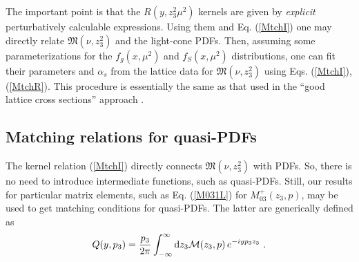 The important point is that the $R(y, z_3^2 \mu^2)$ kernels are given by {\it explicit} perturbatively calculable
expressions. Using them and Eq. (\ref{MtchI}) one may directly relate
${\mathfrak M}(\nu,z_3^2)$ and the light-cone
PDFs.
Then,
assuming some parameterizations for the $f_g(x,\mu^2)$ and $f_S(x, \mu^2)$ distributions,
one can fit their parameters and $\alpha_s$
from the lattice data for ${\mathfrak M}(\nu,z_3^2)$ using Eqs. (\ref{MtchI}), (\ref{MtchR}). This procedure is essentially the same as that used
in the ``good lattice cross sections'' approach \cite{Ma:2014jla,Ma:2017pxb}.

\subsection{Matching relations for quasi-PDFs}

The kernel relation (\ref{MtchI}) directly connects ${\mathfrak M}(\nu,z_3^2)$
with PDFs.
So, there is no need to introduce
intermediate functions, such as quasi-PDFs.
Still, our results for particular matrix elements,
such as Eq. (\ref{M031L}) for $M_{03} ^+(z_3,p)$,
may be used to get matching conditions for quasi-PDFs. The latter
are generically defined \cite{Ji:2013dva} as
\begin{align}
Q(y, p_3) = \frac{p_3}{2 \pi}
\int_{-\infty}^\infty \mathrm{d} z_3
{\cal M} (z_3, p) \, e^{-i y p_3 z_3} \
.
\label{qPDF}
\end{align}


